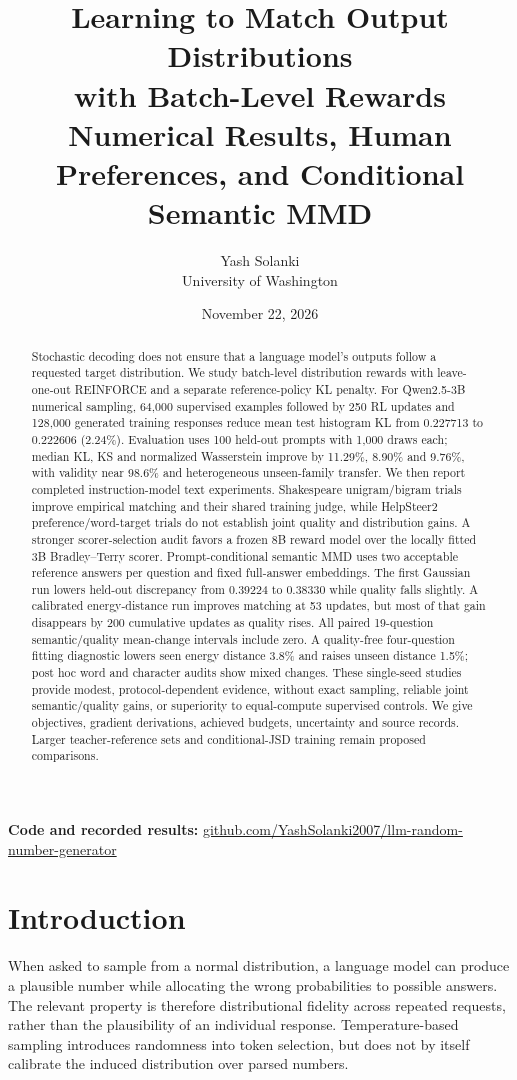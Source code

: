 \documentclass[11pt,letterpaper]{article}
\title{\vspace{-1.1em}\textbf{Learning to Match Output Distributions\\with Batch-Level Rewards}\\[0.4em]
  \large Numerical Results, Human Preferences, and Conditional Semantic MMD}
\author{Yash Solanki\\University of Washington}
\date{November 22, 2026}
\begin{document}
\maketitle
\begin{abstract}
Stochastic decoding does not ensure that a language model's outputs follow
a requested target distribution. We study batch-level distribution rewards
with leave-one-out REINFORCE and a separate reference-policy KL penalty.
For Qwen2.5-3B numerical sampling, 64,000 supervised examples followed by
250 RL updates and 128,000 generated training responses reduce mean test
histogram KL from 0.227713 to 0.222606 (2.24\%). Evaluation uses 100
held-out prompts with 1,000 draws each; median KL, KS and normalized
Wasserstein improve by 11.29\%, 8.90\% and 9.76\%, with validity near
98.6\% and heterogeneous unseen-family transfer. We then report completed
instruction-model text experiments. Shakespeare unigram/bigram trials
improve empirical matching and their shared training judge, while
HelpSteer2 preference/word-target trials do not establish joint quality
and distribution gains. A stronger scorer-selection audit favors a frozen
8B reward model over the locally fitted 3B Bradley--Terry scorer.
Prompt-conditional semantic MMD uses two acceptable reference answers per
question and fixed full-answer embeddings. The first Gaussian run lowers
held-out discrepancy from 0.39224 to 0.38330 while quality falls slightly.
A calibrated energy-distance run improves matching at 53 updates, but
most of that gain disappears by 200 cumulative updates as quality rises.
All paired 19-question semantic/quality mean-change intervals include zero.
A quality-free four-question fitting diagnostic lowers seen energy
distance 3.8\% and raises unseen distance 1.5\%; post hoc word and character
audits show mixed changes. These single-seed studies provide modest,
protocol-dependent evidence, without exact sampling, reliable joint
semantic/quality gains, or superiority to equal-compute supervised
controls. We give objectives, gradient derivations, achieved budgets,
uncertainty and source records. Larger teacher-reference sets and
conditional-JSD training remain proposed comparisons.
\end{abstract}
\vspace{0.3em}
\noindent\textbf{Code and recorded results:}
\href{https://github.com/YashSolanki2007/llm-random-number-generator}{github.com/YashSolanki2007/llm-random-number-generator}

\section{Introduction}
When asked to sample from a normal distribution, a language model can produce
a plausible number while allocating the wrong probabilities to possible
answers. The relevant property is therefore distributional fidelity across
repeated requests, rather than the plausibility of an individual response.
Temperature-based sampling introduces randomness into token selection, but
does not by itself calibrate the induced distribution over parsed numbers.
\end{document}
